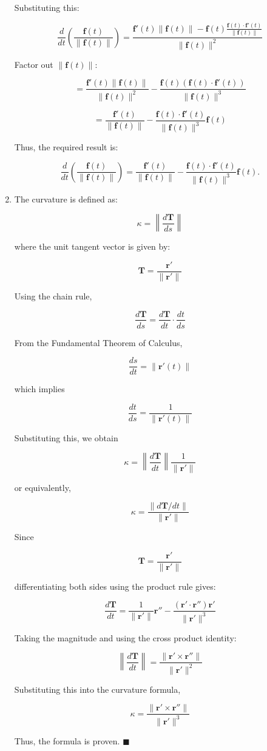 \documentclass[12pt]{article}
\newcommand{\qed}[0]{$\blacksquare$}
\begin{document}
\begin{enumerate}
Substituting this:

\[
\frac{d}{dt} \left( \frac{\mathbf{f}(t)}{\|\mathbf{f}(t)\|} \right) =
\frac{\mathbf{f}'(t) \|\mathbf{f}(t)\| - \mathbf{f}(t) \frac{\mathbf{f}(t) \cdot \mathbf{f}'(t)}{\|\mathbf{f}(t)\|}}{\|\mathbf{f}(t)\|^2}
\]

Factor out \(\|\mathbf{f}(t)\|\):

\[
= \frac{\mathbf{f}'(t) \|\mathbf{f}(t)\|}{\|\mathbf{f}(t)\|^2} - \frac{\mathbf{f}(t) (\mathbf{f}(t) \cdot \mathbf{f}'(t))}{\|\mathbf{f}(t)\|^3}
\]

\[
= \frac{\mathbf{f}'(t)}{\|\mathbf{f}(t)\|} - \frac{\mathbf{f}(t) \cdot \mathbf{f}'(t)}{\|\mathbf{f}(t)\|^3} \mathbf{f}(t)
\]

Thus, the required result is:

\[
\frac{d}{dt} \left( \frac{\mathbf{f}(t)}{\|\mathbf{f}(t)\|} \right) =
\frac{\mathbf{f}'(t)}{\|\mathbf{f}(t)\|} - \frac{\mathbf{f}(t) \cdot \mathbf{f}'(t)}{\|\mathbf{f}(t)\|^3} \mathbf{f}(t).
\]

\item 
The curvature is defined as:

\[
\kappa = \left\| \frac{d\mathbf{T}}{ds} \right\|
\]

where the unit tangent vector is given by:

\[
\mathbf{T} = \frac{\mathbf{r'}}{\|\mathbf{r'}\|}
\]

Using the chain rule,

\[
\frac{d\mathbf{T}}{ds} = \frac{d\mathbf{T}}{dt} \cdot \frac{dt}{ds}
\]

From the Fundamental Theorem of Calculus,

\[
\frac{ds}{dt} = \|\mathbf{r'}(t)\|
\]

which implies

\[
\frac{dt}{ds} = \frac{1}{\|\mathbf{r'}(t)\|}
\]

Substituting this, we obtain

\[
\kappa = \left\| \frac{d\mathbf{T}}{dt} \right\| \frac{1}{\|\mathbf{r'}\|}
\]

or equivalently,

\[
\kappa = \frac{\| d\mathbf{T}/dt \|}{\|\mathbf{r'}\|}
\]

Since 

\[
\mathbf{T} = \frac{\mathbf{r'}}{\|\mathbf{r'}\|}
\]

differentiating both sides using the product rule gives:

\[
\frac{d\mathbf{T}}{dt} = \frac{1}{\|\mathbf{r'}\|} \mathbf{r''} - \frac{(\mathbf{r'} \cdot \mathbf{r''}) \mathbf{r'}}{\|\mathbf{r'}\|^3}
\]

Taking the magnitude and using the cross product identity:

\[
\left\| \frac{d\mathbf{T}}{dt} \right\| = \frac{\|\mathbf{r'} \times \mathbf{r''} \|}{\|\mathbf{r'}\|^2}
\]

Substituting this into the curvature formula,

\[
\kappa = \frac{\| \mathbf{r'} \times \mathbf{r''} \|}{\|\mathbf{r'}\|^3}
\]

Thus, the formula is proven. \qed

\end{enumerate}
\end{document}
